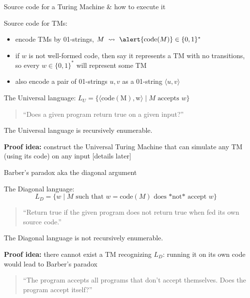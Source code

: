 \documentclass[handout]{beamer}
\begin{document}
\begin{frame}{Source code for a Turing Machine \& how to execute it}

    Source code for TMs:
    \begin{itemize}
        \item encode TMs by 01-strings, $M\ \rightsquigarrow\ \alert{\mathrm{code}(M)}\in\{0,1\}^*$
        \item if $w$ is not well-formed code, then say it represents a TM with no transitions, so every $w\in\{0,1\}^*$ will represent some TM
        \item also encode a pair of 01-strings $u,v$ as a 01-string $\langle u,v\rangle$
    \end{itemize}

    \medskip

    The \alert{Universal language}: $L_U=\{\langle \mathrm{code(M),w}\rangle\mid M\text{ accepts }w\}$

    \medskip
    
    \begin{quote}
        ``Does a given program return true on a given input?''
    \end{quote}

    \medskip

    \begin{theorem}
        The Universal language is recursively enumerable.
    \end{theorem}

    \textbf{Proof idea:} construct the \alert{Universal Turing Machine} that can simulate any TM (using its code) on any input [details later]

\end{frame}


\begin{frame}{Barber's paradox aka the diagonal argument}


    The \alert{Diagonal language}:
    $$
    L_D=\{w\mid M\text{ such that $w=\mathrm{code}(M)$ does *not* accept }w\}
    $$

    \medskip
    
    \begin{quote}
        ``Return true if the given program does not return true when fed its own source code.''
    \end{quote}

    \medskip

    \begin{theorem}
        The Diagonal language is not recursively enumerable.
    \end{theorem}

    \textbf{Proof idea:} there cannot exist a TM recognizing $L_
    D$: running it on its own code would lead to Barber's paradox

    \bigskip

    \begin{quote}
        ``The program accepts all programs that don't accept themselves. Does the program accept itself?''
    \end{quote}    

\end{frame}
\end{document}

